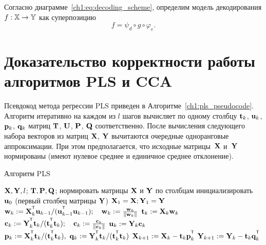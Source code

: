 \begin{definition}
	Согласно диаграмме~\eqref{ch1:eq:decoding_scheme}, определим модель декодирования $f: \mathbb{X} \rightarrow \mathbb{Y}$ как суперпозицию
	\begin{equation}
		f = \psi_d \circ g \circ \varphi_e.
		\label{ch1:eq:def_decoding_function}
	\end{equation}
\end{definition}

\section{Доказательство корректности работы алгоритмов PLS и CCA}

Псевдокод метода регрессии PLS приведен в Алгоритме~\ref{ch1:pls_pseudocode}.
Алгоритм итеративно на каждом из $l$ шагов вычисляет по одному столбцу $\mathbf{t}_k$, $\mathbf{u}_k$, $\mathbf{p}_k$, $\mathbf{q}_k$ матриц $\mathbf{T}$, $\mathbf{U}$, $\mathbf{P}$, $\mathbf{Q}$ соответственно. 
После вычисления следующего набора векторов из матриц $\mathbf{X}$, $\mathbf{Y}$ вычитаются очередные одноранговые аппроксимации. 
При этом предполагается, что исходные матрицы~$\mathbf{X}$ и~$\mathbf{Y}$ нормированы (имеют нулевое среднее и единичное среднее отклонение).

\begin{algorithm}[h]
	\caption{Алгоритм PLS}
	\label{ch1:pls_pseudocode}
	\begin{algorithmic}[1]
		\REQUIRE $\mathbf{X}, \mathbf{Y}, l$;
		\ENSURE $\mathbf{T}, \mathbf{P}, \mathbf{Q}$;
		\STATE нормировать матрицы $\mathbf{X}$ и $\mathbf{Y}$ по столбцам
		\STATE инициализировать $\mathbf{u}_0$ (первый столбец матрицы $\mathbf{Y}$)
		\STATE $\mathbf{X}_1 = \mathbf{X}; \mathbf{Y}_1 = \mathbf{Y}$
		\REPEAT
		\vspace{0.1cm}
		\STATE $\bw_k := \bX_k^{\T} \bu_{k-1} / (\bu_{k-1}^{\T} \bu_{k-1}); \quad \bw_k: = \frac{\bw_k}{\| \bw_k \|}$
		\vspace{0.1cm}
		\STATE $\mathbf{t}_k := \mathbf{X}_k \mathbf{w}_k$
		\vspace{0.1cm}
		\STATE $\bc_k := \bY_k^{\T} \bt_k / (\bt_k^{\T} \bt_k); \quad \bc_k: = \frac{\bc_k}{\| \bc_k \|}$
		\vspace{0.1cm}
		\STATE $\mathbf{u}_k := \mathbf{Y}_k \mathbf{c}_k$
		\vspace{0.1cm}
		\STATE $\bp_k:= \bX_k^{\T}\bt_k/(\bt_k^{\T}\bt_k),\ 
		\bq_k := \bY_k^{\T}\bt_k/(\bt_k^{\T}\bt_k)$
		\vspace{0.2cm}
		\STATE $\bX_{k+1} :=  \bX_k - \bt_k \bp_k^{\T}$
		\vspace{0.2cm}
		\STATE $\bY_{k + 1} :=  \bY_k - \bt_k \bq_k^{\T}$ 
		\ENDFOR
	\end{algorithmic}
\end{algorithm}

